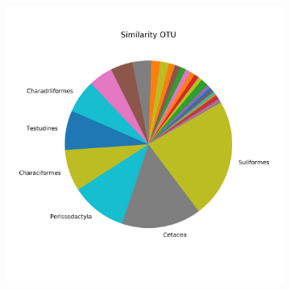 \begin{figure}
	\centering
	\begin{subfigure}{0.45\textwidth}
		\includegraphics[width=\textwidth]{rfr_sim_order_pieOTU}
	\end{subfigure}
\end{figure}